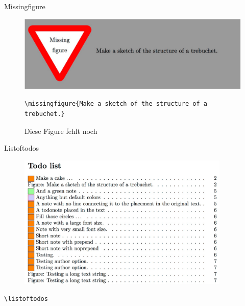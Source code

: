 \documentclass[hyperref={pdfpagelabels=false}]{beamer}
\begin{document}
\begin{frame}[fragile]{Missingfigure}
    \begin{figure}
        \centering
            \includegraphics[width = \textwidth]{figures/missingfigure.pdf}
        \caption{Diese Figure fehlt noch}
        \label{fig:missing}
        \begin{Verbatim}
\missingfigure{Make a sketch of the structure of a trebuchet.}
        \end{Verbatim}
    \end{figure}
\end{frame}
\begin{frame}[fragile]{Listoftodos}
    \begin{figure}
        \centering
        \includegraphics[width=0.9\textwidth]{figures/listoftodos.pdf}
    \end{figure}
    \verb!\listoftodos!
\end{frame}
\end{document}
